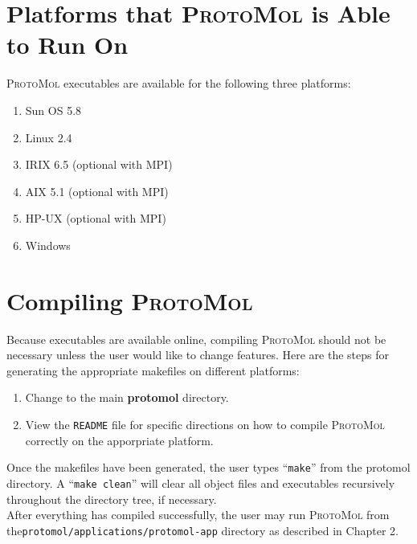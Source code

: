 \documentclass[11pt]{report}
\newcommand{\ProtoMol}{\textsc{ProtoMol }}
\providecommand{\ttsmall}[1]{\texttt{\small\mbox{#1}}}
\begin{document}
\section{Platforms that \ProtoMol is Able to Run On}

\ProtoMol executables are available for the following three platforms:

\begin{enumerate}
\item Sun OS 5.8
\item Linux 2.4 
\item IRIX 6.5 (optional with MPI)
\item AIX 5.1 (optional with MPI)
\item HP-UX (optional with MPI)
\item Windows
\end{enumerate}

\section{Compiling \ProtoMol}

Because executables are available online, compiling \ProtoMol should
not be necessary unless the user would like to change features.   Here
are the steps for generating the appropriate makefiles on different
platforms:


\begin{enumerate}

\item Change to the main {\bf protomol} directory.

\item View the \ttsmall{README} file for specific directions on how to
compile \ProtoMol correctly on the apporpriate platform.

\end{enumerate}


Once the makefiles have been generated, the user types
``\ttsmall{make}'' from the protomol directory.  A ``\ttsmall{make
clean}'' will clear all object files and executables recursively
throughout the directory tree, if necessary.\\


After everything has compiled successfully, the user may run \ProtoMol
from the\newline \ttsmall{protomol/applications/protomol-app} directory
as described in Chapter 2.

\end{document}
